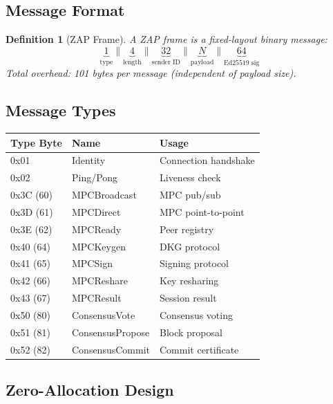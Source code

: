 \documentclass[11pt,letterpaper]{article}
\newtheorem{definition}{Definition}
\begin{document}
\subsection{Message Format}

\begin{definition}[ZAP Frame]
A ZAP frame is a fixed-layout binary message:
\[
\underbrace{1}_{\text{type}} \| \underbrace{4}_{\text{length}} \| \underbrace{32}_{\text{sender ID}} \| \underbrace{N}_{\text{payload}} \| \underbrace{64}_{\text{Ed25519 sig}}
\]
Total overhead: 101 bytes per message (independent of payload size).
\end{definition}

\subsection{Message Types}

\begin{table}[h]
\centering
\begin{tabular}{lll}
\toprule
\textbf{Type Byte} & \textbf{Name} & \textbf{Usage} \\
\midrule
0x01 & Identity & Connection handshake \\
0x02 & Ping/Pong & Liveness check \\
0x3C (60) & MPCBroadcast & MPC pub/sub \\
0x3D (61) & MPCDirect & MPC point-to-point \\
0x3E (62) & MPCReady & Peer registry \\
0x40 (64) & MPCKeygen & DKG protocol \\
0x41 (65) & MPCSign & Signing protocol \\
0x42 (66) & MPCReshare & Key resharing \\
0x43 (67) & MPCResult & Session result \\
0x50 (80) & ConsensusVote & Consensus voting \\
0x51 (81) & ConsensusPropose & Block proposal \\
0x52 (82) & ConsensusCommit & Commit certificate \\
\bottomrule
\end{tabular}
\end{table}

\subsection{Zero-Allocation Design}
\end{document}
